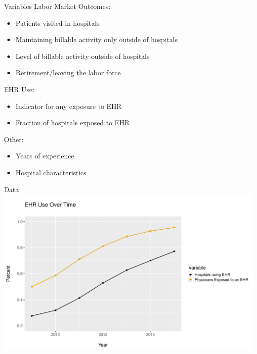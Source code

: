 \documentclass[10pt]{beamer}
\begin{document}
\begin{frame}{Variables}
Labor Market Outcomes:
\vspace{-2mm}
\begin{itemize}
    \item Patients visited in hospitals
    \item \color{gray} Maintaining billable activity only outside of hospitals
    \item \color{gray} Level of billable activity outside of hospitals
    \item \color{gray} Retirement/leaving the labor force
\end{itemize}

EHR Use:
\vspace{-2mm}
\begin{itemize}
    \item Indicator for any exposure to EHR
    \item \color{gray} Fraction of hospitals exposed to EHR
\end{itemize}

Other:
\vspace{-2mm}
\begin{itemize}
    \item Years of experience
    \item Hospital characteristics
\end{itemize}

\end{frame}


\begin{frame}{Data}
    \centering
    \includegraphics[scale=.5]{Objects/sum_stats_year.pdf}
\end{frame}
\end{document}
